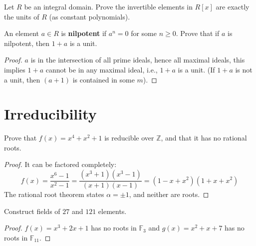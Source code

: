 \documentclass[openany]{book}
\newcommand{\Z}{\mathbb{Z}}
\newcommand{\F}{\mathbb{F}}
\begin{document}
\begin{prop}[4.18]
    Let \( R \) be an integral domain. Prove the invertible elements in \( R[x] \) are exactly the units of \( R \) (as constant polynomials).
\end{prop}



\begin{prob}[4.19]
    An element \( a \in R \) is \textbf{nilpotent} if \( a^n = 0 \) for some \( n \geq 0 \). Prove that if \( a \) is nilpotent, then \( 1 + a \) is a unit.
\end{prob}
\begin{proof}
    $a$ is in the intersection of all prime ideals, hence all maximal ideals, this implies $1+a$ cannot be in any maximal ideal, i.e., $1+a$ is a unit. (If $1+a$ is not a unit, then $(a+1)$ is contained in some $m$).
\end{proof}




\section{Irreducibility}

\begin{prob}[5.4]
    Prove that $f(x)=x^4+x^2+1$ is reducible over $\Z$, and that it has no rational roots.
\end{prob}
\begin{proof}
    It can be factored completely: 
    \begin{equation*}
        f(x)=\frac{x^6-1}{x^2-1}=\frac{(x^3+1)(x^3-1)}{(x+1)(x-1)}=(1-x+x^2)(1+x+x^2)
    \end{equation*}
    The rational root theorem states $\alpha=\pm1$, and neither are roots.
\end{proof}

\begin{prob}[5.6]
    Construct fields of $27$ and $121$ elements.
\end{prob}
\begin{proof}
    $f(x)=x^3+2x+1$ has no roots in $\F_3$ and $g(x)=x^2+x+7$ has no roots in $\F_{11}$.
\end{proof}
\end{document}
